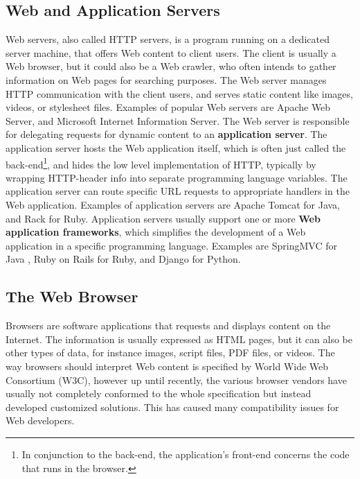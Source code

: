\subsection{Web and Application Servers}
Web servers, also called HTTP servers, is a program running on a dedicated server machine, that offers Web content to client users. The client is usually a Web browser, but it could also be a Web crawler, who often intends to gather information on Web pages for searching purposes. The Web server manages  HTTP communication with the client users, and serves static content like images, videos, or stylesheet files. Examples of popular Web servers are Apache Web Server\cite{apache}, and Microsoft Internet Information Server\cite{iis}. The Web server is responsible for delegating requests for dynamic content to an \textbf{application server}. The application server hosts the Web application itself, which is often just called the back-end\footnote{In conjunction to the back-end, the application's front-end concerns the code that runs in the browser.}, and hides the low level implementation of HTTP, typically by wrapping HTTP-header info into separate programming language variables. The application server can route specific URL requests to appropriate handlers in the Web application. Examples of application servers are Apache Tomcat \cite{tomcat} for Java, and Rack \cite{rack} for Ruby. Application servers usually support one or more \textbf{Web application frameworks}, which simplifies the development of a Web application in a specific programming language. Examples are SpringMVC for Java \cite{expertsOneToOne}, Ruby on Rails for Ruby\cite{rails}, and Django for Python\cite{django}.

\subsection{The Web Browser}
Browsers are software applications that requests and displays content on the Internet. The information is usually expressed as HTML pages, but it can also be other types of data, for instance images, script files, PDF files, or videos. The way browsers should interpret Web content is specified by World Wide Web Consortium (W3C)\cite{w3c}, however up until recently, the various browser vendors have usually not completely conformed to the whole specification but instead developed customized solutions. This has caused many compatibility issues for Web developers.   

